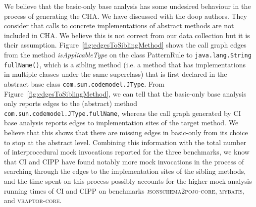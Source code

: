 We believe that the basic-only base analysis has some undesired behaviour in the process of generating the CHA. We have discussed with the doop authors. They consider that calls to concrete implementations of abstract methods are not included in CHA. We believe this is not correct from our data collection but it is their assumption. Figure~\ref{fig:edgesToSiblingMethod} shows the call graph edges from the method \textit{isApplicableType} on the class PatternRule to \texttt{java.lang.String fullName()}, which is a sibling method (i.e. a method that has implementations in multiple classes under the same superclass) that is first declared in the abstract base class \texttt{com.sun.codemodel.JType}. From Figure~\ref{fig:edgesToSiblingMethod}, we can tell that the basic-only base analysis only reports edges to the (abstract) method \texttt{com.sun.codemodel.JType.fullName}, whereas the call graph generated by CI base analysis reports edges to implementation sites of the target method. We believe that this shows that there are missing edges in basic-only from its choice to stop at the abstract level. Combining this information with the total number of interprocedural mock invocations reported for the three benchmarks, we know that CI and CIPP have found notably more mock invocations in the process of searching through the edges to the implementation sites of the sibling methods, and the time spent on this process possibly accounts for the higher mock-analysis running times of CI and CIPP on benchmarks \textsc{jsonschema2pojo-core}, \textsc{mybatis}, and \textsc{vraptor-core}.


